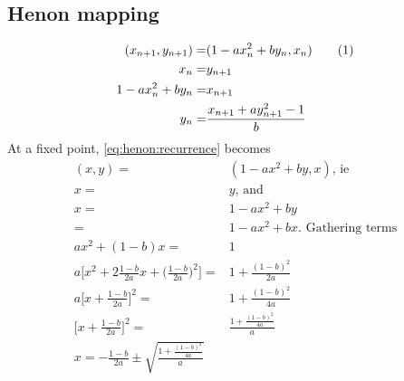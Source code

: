 \documentclass[]{article}
\newcommand\numberthis{\addtocounter{equation}{1}\tag{\theequation}}
\begin{document}
\subsection{Henon mapping}
\begin{align*}
	(x_{n+1},y_{n+1}) =& (1-ax_n^2+by_n,x_n) \numberthis \label{eq:henon:recurrence}\\
	x_n =& y_{n+1}\\
	1-ax_n^2+by_n =& x_{n+1}\\
	y_n =& \frac{x_{n+1} + a  y_{n+1}^2-1}{b}
\end{align*}
At a fixed point, \eqref{eq:henon:recurrence} becomes
\begin{align*}
	(x,y) =& (1-ax^2+by,x)\text{, ie}\\
	x =& y \text{, and}\\
	x =& 1-ax^2 +by\\
	=& 1-ax^2 +bx\text{. Gathering terms}\\
	ax^2 + (1-b)x = &1\\
	a\big[x^2 + 2\frac{1-b}{2a}x + \big(\frac{1-b}{2a}\big)^2\big]  = &1+ \frac{(1-b)^2}{2a}\\
	a\big[x+ \frac{1-b}{2a}\big]^2= &1+ \frac{(1-b)^2}{4a}\\
	\big[x+ \frac{1-b}{2a}\big]^2= &\frac{1+ \frac{(1-b)^2}{4a}}{a}\\
	x = - \frac{1-b}{2a} \pm \sqrt{\frac{1+ \frac{(1-b)^2}{4a}}{a}}
\end{align*}


\end{document}
